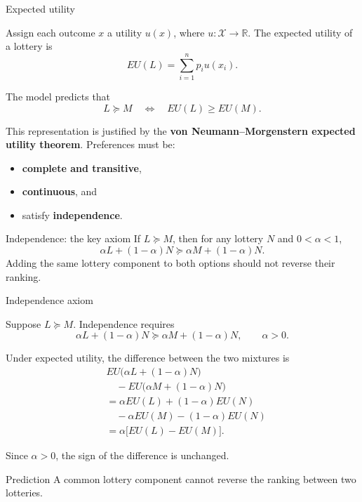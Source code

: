 \documentclass[12pt]{beamer}
\begin{document}
\begin{frame}{Expected utility}
\scriptsize

Assign each outcome $x$ a utility $u(x)$, where
$u:\mathcal{X}\rightarrow\mathbb{R}$.
The expected utility of a lottery is
\[
EU(L)=\sum_{i=1}^n p_i u(x_i).
\]

The model predicts that
\[
L\succeq M
\quad\Longleftrightarrow\quad
EU(L)\geq EU(M).
\]

This representation is justified by the
\textbf{von Neumann--Morgenstern expected utility theorem}.
Preferences must be:
\begin{itemize}
    \item \textbf{complete and transitive},
    \item \textbf{continuous}, and
    \item satisfy \textbf{independence}.
\end{itemize}

\vspace{0.05cm}
\begin{alertblock}{Independence: the key axiom}
If $L\succeq M$, then for any lottery $N$ and
$0<\alpha<1$,
\[
\alpha L+(1-\alpha)N
\succeq
\alpha M+(1-\alpha)N.
\]
Adding the same lottery component to both options should not
reverse their ranking.
\end{alertblock}

\end{frame}

\begin{frame}{Independence axiom}
\small

Suppose $L\succeq M$. Independence requires
\[
\alpha L+(1-\alpha)N
\succeq
\alpha M+(1-\alpha)N,
\qquad \alpha>0.
\]

Under expected utility, the difference between the two
mixtures is
\[
\begin{aligned}
&EU\bigl(\alpha L+(1-\alpha)N\bigr)\\
&\quad-EU\bigl(\alpha M+(1-\alpha)N\bigr)\\
&=\alpha EU(L)+(1-\alpha)EU(N)\\
&\quad-\alpha EU(M)-(1-\alpha)EU(N)\\
&=\alpha\bigl[EU(L)-EU(M)\bigr].
\end{aligned}
\]

Since $\alpha>0$, the sign of the difference is unchanged.

\begin{block}{Prediction}
A common lottery component cannot reverse the ranking
between two lotteries.
\end{block}

\end{frame}
\end{document}
